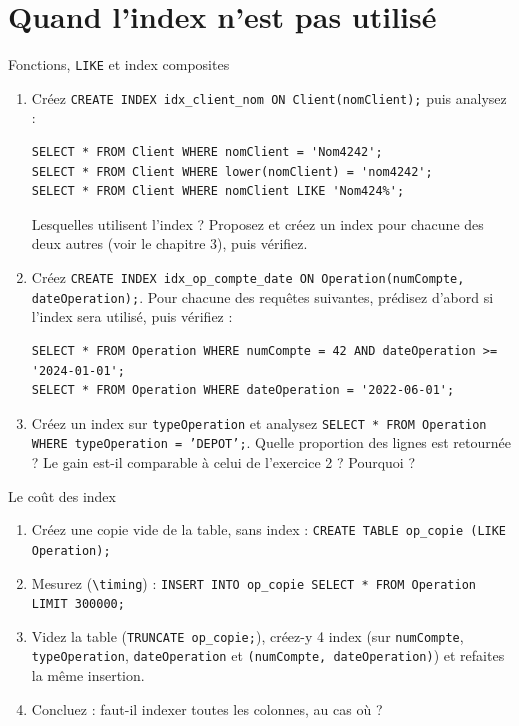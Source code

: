 \documentclass[11pt]{article}
\begin{document}
\section{Quand l'index n'est pas utilis\'e}

\begin{exobox}{Fonctions, \texttt{LIKE} et index composites}
\begin{enumerate}[label=\alph*)]
  \item Cr\'eez \texttt{CREATE INDEX idx\_client\_nom ON Client(nomClient);} puis analysez :
\begin{lstlisting}
SELECT * FROM Client WHERE nomClient = 'Nom4242';
SELECT * FROM Client WHERE lower(nomClient) = 'nom4242';
SELECT * FROM Client WHERE nomClient LIKE 'Nom424%';
\end{lstlisting}
        Lesquelles utilisent l'index ? Proposez et cr\'eez un index pour chacune des deux autres
        (voir le chapitre 3), puis v\'erifiez.
  \item Cr\'eez \texttt{CREATE INDEX idx\_op\_compte\_date ON Operation(numCompte, dateOperation);}.
        Pour chacune des requ\^etes suivantes, pr\'edisez d'abord si l'index sera utilis\'e, puis v\'erifiez :
\begin{lstlisting}
SELECT * FROM Operation WHERE numCompte = 42 AND dateOperation >= '2024-01-01';
SELECT * FROM Operation WHERE dateOperation = '2022-06-01';
\end{lstlisting}
  \item Cr\'eez un index sur \texttt{typeOperation} et analysez \texttt{SELECT * FROM Operation WHERE typeOperation = 'DEPOT';}.
        Quelle proportion des lignes est retourn\'ee ? Le gain est-il comparable \`a celui de l'exercice 2 ? Pourquoi ?
\end{enumerate}
\end{exobox}

\begin{exobox}{Le co\^ut des index}
\begin{enumerate}[label=\alph*)]
  \item Cr\'eez une copie vide de la table, sans index : \texttt{CREATE TABLE op\_copie (LIKE Operation);}
  \item Mesurez (\texttt{\textbackslash timing}) : \texttt{INSERT INTO op\_copie SELECT * FROM Operation LIMIT 300000;}
  \item Videz la table (\texttt{TRUNCATE op\_copie;}), cr\'eez-y 4 index (sur \texttt{numCompte}, \texttt{typeOperation},
        \texttt{dateOperation} et \texttt{(numCompte, dateOperation)}) et refaites la m\^eme insertion.
  \item Concluez : faut-il indexer \og toutes les colonnes, au cas o\`u \fg{} ?
\end{enumerate}
\end{exobox}
\end{document}
